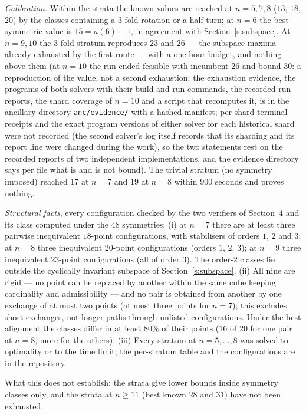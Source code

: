 \documentclass[11pt,a4paper]{article}
\begin{document}
\emph{Calibration.}  Within the strata the known values are reached at $n=5,7,8$ ($13$, $18$,
$20$) by the classes containing a $3$-fold rotation or a half-turn; at $n=6$ the best symmetric
value is $15=a(6)-1$, in agreement with Section~\ref{s:subspace}.  At $n=9,10$ the $3$-fold
stratum reproduces $23$ and $26$ --- the subspace maxima already exhausted by the first route ---
with a one-hour budget, and nothing above them (at $n=10$ the run ended feasible with incumbent $26$
and bound $30$: a reproduction of the value, not a second exhaustion; the exhaustion evidence, the
programs of both solvers with their build and run commands, the recorded run reports, the shard coverage
of $n=10$ and a script that recomputes it, is in the ancillary directory \texttt{anc/evidence/} with a
hashed manifest; per-shard terminal receipts and the exact program versions of either solver for each
historical shard were not recorded (the second solver's log itself records that its sharding and its
report line were changed during the work), so the two statements rest on the recorded reports of two
independent implementations, and the evidence directory says per file what is and is not bound).  The trivial stratum (no symmetry imposed)
reached $17$ at $n=7$ and $19$ at $n=8$ within $900$ seconds and proves nothing.

\emph{Structural facts}, every configuration checked by the two verifiers of Section~4 and its
class computed under the $48$ symmetries: (i) at $n=7$ there are at least three pairwise
inequivalent $18$-point configurations, with stabilisers of orders $1$, $2$ and $3$; at $n=8$
three inequivalent $20$-point configurations (orders $1$, $2$, $3$); at $n=9$ three inequivalent
$23$-point configurations (all of order $3$).  The order-$2$ classes lie outside the cyclically
invariant subspace of Section~\ref{s:subspace}.  (ii) All nine are rigid --- no point can be
replaced by another within the same cube keeping cardinality and admissibility --- and no pair is
obtained from another by one exchange of at most two points (at most three points for $n=7$); this
excludes short exchanges, not longer paths through unlisted configurations.  Under the best alignment the classes differ in at least $80\%$ of
their points ($16$ of $20$ for one pair at $n=8$, more for the others).  (iii) Every stratum at $n=5,\dots,8$ was solved to optimality or to the time limit;
the per-stratum table and the configurations are in the repository.

What this does not establish: the strata give lower bounds inside symmetry classes only, and the
strata at $n\ge11$ (best known $28$ and $31$) have not been exhausted.
\end{document}
